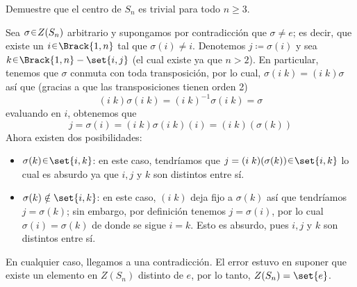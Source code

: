 \begin{ejer}
Demuestre que el centro de $S_n$ es trivial para todo $n \geq 3$.
\end{ejer}
\begin{sol}[Demostración]
Sea $\sigma \en Z(S_n)$ arbitrario y supongamos por contradicción que $\sigma \neq e$; es decir, que existe un $i \en \Brack{1,n}$ tal que $\sigma(i) \neq i$. Denotemos $j \coloneq \sigma(i)$ y sea $k \en \Brack{1,n} - \set{i,j}$ (el cual existe ya que $n >2$). En particular, tenemos que $\sigma$ conmuta con toda transposición, por lo cual, $\sigma (i\;k) = (i\;k) \sigma$ así que (gracias a que las transposiciones tienen orden 2)
\[
(i\;k) \sigma (i\;k) = (i\;k)^{-1} \sigma (i\;k) = \sigma
\]
evaluando en $i$, obtenemos que
\[
j = \sigma(i) = (i\;k) \sigma (i\;k)(i)%
= (i\;k)(\sigma(k))
\]
Ahora existen dos posibilidades:
\begin{itemize}
    \item $\sigma(k) \en \set{i,k}$: en este caso, tendríamos que $j = (i\;k)(\sigma(k))\en \set{i,k}$ lo cual es absurdo ya que $i,j$ y $k$ son distintos entre sí.

    \item  $\sigma(k) \notin \set{i,k}$: en este caso, $(i\;k)$ deja fijo a $\sigma(k)$ así que tendríamos $j = \sigma(k)$; sin embargo, por definición tenemos $j = \sigma(i)$, por lo cual $\sigma(i) = \sigma(k)$ de donde se sigue $i=k$. Esto es absurdo, pues $i,j$ y $k$ son distintos entre sí.
\end{itemize}
En cualquier caso, llegamos a una contradicción. El error estuvo en suponer que existe un elemento en $Z(S_n)$ distinto de $e$, por lo tanto, $Z(S_n) = \set{e}$.
\end{sol}

